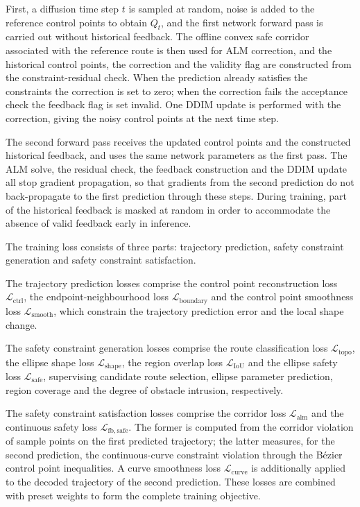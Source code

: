 \documentclass[journal]{IEEEtran}
\begin{document}
First, a diffusion time step $t$ is sampled at random, noise is added to the
reference control points to obtain $Q_t$, and the first network forward pass is
carried out without historical feedback. The offline convex safe corridor
associated with the reference route is then used for ALM correction, and the
historical control points, the correction and the validity flag are constructed
from the constraint-residual check. When the prediction already satisfies the
constraints the correction is set to zero; when the correction fails the
acceptance check the feedback flag is set invalid. One DDIM update is performed
with the correction, giving the noisy control points at the next time step.

The second forward pass receives the updated control points and the constructed
historical feedback, and uses the same network parameters as the first pass.
The ALM solve, the residual check, the feedback construction and the DDIM
update all stop gradient propagation, so that gradients from the second
prediction do not back-propagate to the first prediction through these steps.
During training, part of the historical feedback is masked at random in order
to accommodate the absence of valid feedback early in inference.

The training loss consists of three parts: trajectory prediction, safety
constraint generation and safety constraint satisfaction.

The trajectory prediction losses comprise the control point reconstruction loss
$\mathcal L_{\mathrm{ctrl}}$, the endpoint-neighbourhood loss
$\mathcal L_{\mathrm{boundary}}$ and the control point smoothness loss
$\mathcal L_{\mathrm{smooth}}$, which constrain the trajectory prediction error
and the local shape change.

The safety constraint generation losses comprise the route classification loss
$\mathcal L_{\mathrm{topo}}$, the ellipse shape loss
$\mathcal L_{\mathrm{shape}}$, the region overlap loss
$\mathcal L_{\mathrm{IoU}}$ and the ellipse safety loss
$\mathcal L_{\mathrm{safe}}$, supervising candidate route selection, ellipse
parameter prediction, region coverage and the degree of obstacle intrusion,
respectively.

The safety constraint satisfaction losses comprise the corridor loss
$\mathcal L_{\mathrm{alm}}$ and the continuous safety loss
$\mathcal L_{\mathrm{fb,safe}}$. The former is computed from the corridor
violation of sample points on the first predicted trajectory; the latter
measures, for the second prediction, the continuous-curve constraint violation
through the B\'ezier control point inequalities. A curve smoothness loss
$\mathcal L_{\mathrm{curve}}$ is additionally applied to the decoded trajectory
of the second prediction. These losses are combined with preset weights to form
the complete training objective.
\end{document}
